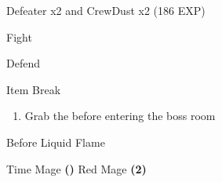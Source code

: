 \begin{paracol}{2}
\switchcolumn
\begin{encounter}{Defeater x2 and CrewDust x2 (186 EXP)}
    \varwb
    \begin{notes}
        \item {}
        \item {}
    \end{notes}
    \begin{round}{1}
        \bartz Fight \then {}
        \begin{notes}
            \item[] 
        \end{notes}
        \faris Defend
        \begin{notes}
            \item[] 
        \end{notes}
        \lenna Item \then {} \then Break
        \begin{notes}
            \item[] 
        \end{notes}
    \end{round}
    \varwe
\end{encounter}

\begin{enumerate}[resume]
    \item Grab the  before entering the boss room
\end{enumerate}

\begin{menu}{Before Liquid Flame}
    \varwb
    \begin{jobMenu}
        \lenna Time Mage \textbf{(\pointDown)} \optimize
        \faris Red Mage \textbf{(2\pointLeft)} \optimize
    \end{jobMenu}
    \begin{magicMenu}
        \faris \cure \space \then {}
    \end{magicMenu}
    \varwe
\end{menu}


\end{paracol}
